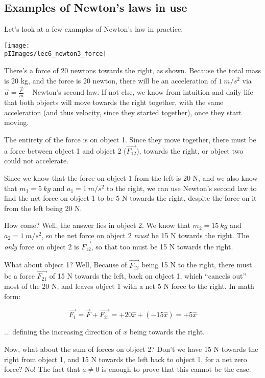 \subsection{Examples of Newton's laws in use}

Let's look at a few examples of Newton's law in practice.

\begin{center}
\texttt{[image: \\pIImages/lec6\_newton3\_force]}
\end{center}

There's a force of 20 newtons towards the right, as shown. Because the total mass is 20 kg, and the force is 20 newton, there will be an acceleration of $\SI{1}{m/s^2}$ via $\displaystyle \vec{a} = \frac{\vec{F}}{m}$ -- Newton's second law. If not else, we know from intuition and daily life that both objects will move towards the right together, with the same acceleration (and thus velocity, since they started together), once they start moving.

The entirety of the force is on object 1. Since they move together, there must be a force between object 1 and object 2 ($\vec{F_{12}}$), towards the right, or object two could not accelerate.

Since we know that the force on object 1 from the left is 20 N, and we also know that $m_1 = \SI{5}{kg}$ and $a_1 = \SI{1}{m/s^2}$ to the right, we can use Newton's second law to find the net force on object 1 to be 5 N towards the right, despite the force on it from the left being 20 N.

How come? Well, the answer lies in object 2. We know that $m_2 = \SI{15}{kg}$ and $a_2 = \SI{1}{m/s^2}$, so the net force on object 2 \emph{must} be 15 N towards the right. The \emph{only} force on object 2 is $\vec{F_{12}}$, so that too must be 15 N towards the right.

What about object 1? Well, Because of $\vec{F_{12}}$ being 15 N to the right, there must be a force $\vec{F_{21}}$ of 15 N towards the left, back on object 1, which ``cancels out'' most of the 20 N, and leaves object 1 with a net 5 N force to the right. In math form:

\begin{equation}
\vec{F_1} = \vec{F} + \vec{F_{21}} = +20\hat{x} + (-15\hat{x}) = +5 \hat{x}
\end{equation}

... defining the increasing direction of $x$ being towards the right.

Now, what about the sum of forces on object 2? Don't we have 15 N towards the right from object 1, and 15 N towards the left back to object 1, for a net zero force? No! The fact that $a \neq 0$ is enough to prove that this cannot be the case.

